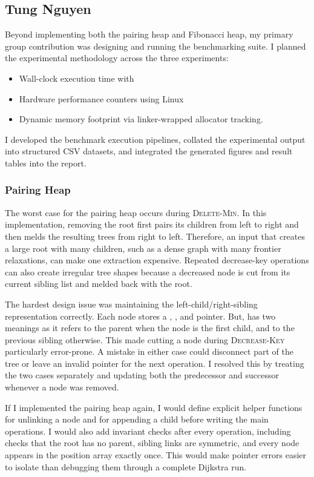 \subsection{Tung Nguyen}
Beyond implementing both the pairing heap and Fibonacci heap, my primary group contribution was designing and running the benchmarking suite. I planned the experimental methodology across the three experiments: 
\begin{itemize}
    \item Wall-clock execution time with 
    \item Hardware performance counters using Linux 
    \item Dynamic memory footprint via linker-wrapped allocator tracking.
\end{itemize}
 I developed the benchmark execution pipelines, collated the experimental output into structured CSV datasets, and integrated the generated figures and result tables into the report.
\subsubsection{Pairing Heap}

The worst case for the pairing heap occurs during \textsc{Delete-Min}. In this implementation, removing the root first pairs its children
from left to right and then melds the resulting trees from right to left.
Therefore, an input that creates a large root with many children, such as a
dense graph with many frontier relaxations, can make one extraction expensive.
Repeated decrease-key operations can also create irregular tree shapes because
a decreased node is cut from its current sibling list and melded back with the
root.

The hardest design issue was maintaining the left-child/right-sibling
representation correctly. Each node stores a , , and
 pointer. But,  has two meanings as it refers to the parent
when the node is the first child, and to the previous sibling otherwise. This
made cutting a node during \textsc{Decrease-Key} particularly error-prone. A
mistake in either case could disconnect part of the tree or leave an invalid
pointer for the next operation. I resolved this by treating the two cases
separately and updating both the predecessor and successor whenever a node was
removed.

If I implemented the pairing heap again, I would define explicit helper
functions for unlinking a node and for appending a child before writing the
main operations. I would also add invariant checks after every operation,
including checks that the root has no parent, sibling links are symmetric, and
every node appears in the position array exactly once. This would make pointer
errors easier to isolate than debugging them through a complete Dijkstra run.

